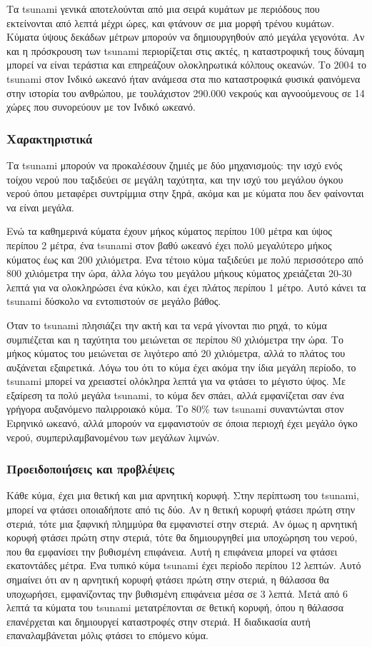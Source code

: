 Τα tsunami γενικά αποτελούνται από μια σειρά κυμάτων με περιόδους που εκτείνονται από λεπτά μέχρι ώρες, και φτάνουν σε μια μορφή τρένου κυμάτων. Κύματα ύψους δεκάδων μέτρων μπορούν να δημιουργηθούν από μεγάλα γεγονότα. Αν και η πρόσκρουση των tsunami περιορίζεται στις ακτές, η καταστροφική τους δύναμη μπορεί να είναι τεράστια και επηρεάζουν ολοκληρωτικά κόλπους οκεανών. Το 2004 το tsunami στον Ινδικό ωκεανό ήταν ανάμεσα στα πιο καταστροφικά φυσικά φαινόμενα στην ιστορία του ανθρώπου, με τουλάχιστον 290.000 νεκρούς και αγνοούμενους σε 14 χώρες που συνορεύουν με τον Ινδικό ωκεανό.

\subsubsection{Χαρακτηριστικά}
Τα tsunami μπορούν να προκαλέσουν ζημιές με δύο μηχανισμούς: την ισχύ ενός τοίχου νερού που ταξιδεύει σε μεγάλη ταχύτητα, και την ισχύ του μεγάλου όγκου νερού όπου μεταφέρει συντρίμμια στην ξηρά, ακόμα και με κύματα που δεν φαίνονται να είναι μεγάλα.

Ενώ τα καθημερινά κύματα έχουν μήκος κύματος περίπου 100 μέτρα και ύψος περίπου 2 μέτρα, ένα tsunami στον βαθύ ωκεανό έχει πολύ μεγαλύτερο μήκος κύματος έως και 200 χιλιόμετρα. Ένα τέτοιο κύμα ταξιδεύει με πολύ περισσότερο από 800 χιλιόμετρα την ώρα, άλλα λόγω του μεγάλου μήκους κύματος χρειάζεται 20-30 λεπτά για να ολοκληρώσει ένα κύκλο, και έχει πλάτος περίπου 1 μέτρο. Αυτό κάνει τα tsunami δύσκολο να εντοπιστούν σε μεγάλο βάθος.

Όταν το tsunami πλησιάζει την ακτή και τα νερά γίνονται πιο ρηχά, το κύμα συμπιέζεται και η ταχύτητα του μειώνεται σε περίπου 80 χιλιόμετρα την ώρα. Το μήκος κύματος του μειώνεται σε λιγότερο από 20 χιλιόμετρα, αλλά το πλάτος του αυξάνεται εξαιρετικά. Λόγω του ότι το κύμα έχει ακόμα την ίδια μεγάλη περίοδο, το tsunami μπορεί να χρειαστεί ολόκληρα λεπτά για να φτάσει το μέγιστο ύψος. Με εξαίρεση τα πολύ μεγάλα tsunami, το κύμα δεν σπάει, αλλά εμφανίζεται σαν ένα γρήγορα αυξανόμενο παλιρροιακό κύμα. Το 80\% των tsunami συναντώνται στον Ειρηνικό ωκεανό, αλλά μπορούν να εμφανιστούν σε όποια περιοχή έχει μεγάλο όγκο νερού, συμπεριλαμβανομένου των μεγάλων λιμνών.

\subsubsection{Προειδοποιήσεις και προβλέψεις}
Κάθε κύμα, έχει μια θετική και μια αρνητική κορυφή. Στην περίπτωση του tsunami, μπορεί να φτάσει οποιαδήποτε από τις δύο. Αν η θετική κορυφή φτάσει πρώτη στην στεριά, τότε μια ξαφνική πλημμύρα θα εμφανιστεί στην στεριά. Αν όμως η αρνητική κορυφή φτάσει πρώτη στην στεριά, τότε θα δημιουργηθεί μια υποχώρηση του νερού, που θα εμφανίσει την βυθισμένη επιφάνεια. Αυτή η επιφάνεια μπορεί να φτάσει εκατοντάδες μέτρα. Ένα τυπικό κύμα tsunami έχει περίοδο περίπου 12 λεπτών. Αυτό σημαίνει ότι αν η αρνητική κορυφή φτάσει πρώτη στην στεριά, η θάλασσα θα υποχωρήσει, εμφανίζοντας την βυθισμένη επιφάνεια μέσα σε 3 λεπτά. Μετά από 6 λεπτά τα κύματα του tsunami μετατρέπονται σε θετική κορυφή, όπου η θάλασσα επανέρχεται και δημιουργεί καταστροφές στην στεριά. Η διαδικασία αυτή επαναλαμβάνεται μόλις φτάσει το επόμενο κύμα.

